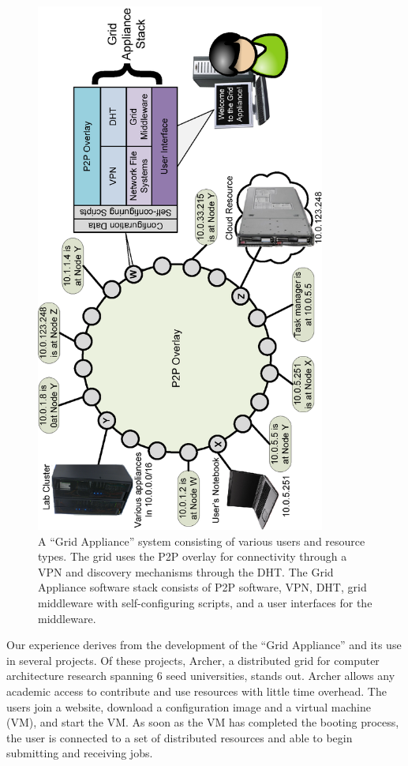 \documentclass[conference]{IEEEtran}
\begin{document}
\begin{figure}[ht]
\centering
\includegraphics[width=3.75in,angle=-90]{figs/appliance_overlays.eps}
\caption{A ``Grid Appliance'' system consisting of various users and resource
types.  The grid uses the P2P overlay for connectivity through a VPN and
discovery mechanisms through the DHT.  The Grid Appliance software stack
consists of P2P software, VPN, DHT, grid middleware with self-configuring
scripts, and a user interfaces for the middleware.}
\label{fig:appliance}
\end{figure}

Our experience derives from the development of the ``Grid Appliance'' and its
use in several projects.  Of these projects, Archer, a distributed grid for
computer architecture research spanning 6 seed universities, stands out.
Archer allows any academic access to contribute and use resources with little
time overhead.  The users join a website, download a configuration image and a
virtual machine (VM), and start the VM.  As soon as the VM has completed the
booting process, the user is connected to a set of distributed resources and
able to begin submitting and receiving jobs.
\end{document}
